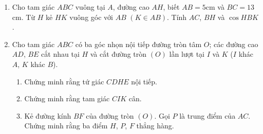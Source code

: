 \begin{ex}%
	\begin{enumerate}
		\item Cho tam giác $ABC$ vuông tại $A$, đường cao $AH$, biết $AB=5$cm và $BC=13$cm. Từ $H$ kẻ $HK$ vuông góc với $AB$ $(K\in AB)$. Tính $AC$, $BH$ và $\cos HBK$.
		\item Cho tam giác $ABC$ có ba góc nhọn nội tiếp đường tròn tâm $O$; các đường cao $AD$, $BE$ cắt nhau tại $H$ và cắt đường tròn $(O)$ lần lượt tại $I$ và $K$ ($I$ khác $A$, $K$ khác $B$).
		\begin{enumerate}
			\item Chứng minh rằng tứ giác $CDHE$ nội tiếp.
			\item Chứng minh rằng tam giác $CIK$ cân.
			\item Kẻ đường kính $BF$ của đường tròn $(O)$. Gọi $P$ là trung điểm của $AC$. Chứng minh rằng ba điểm $H$, $P$, $F$ thẳng hàng.
		\end{enumerate}
	\end{enumerate}
\end{ex}

